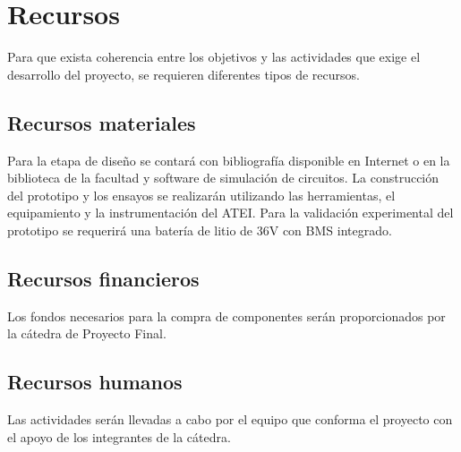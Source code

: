 \section{Recursos}

Para que exista coherencia entre los objetivos y las actividades que exige el desarrollo del proyecto, se requieren diferentes tipos de recursos. 

\subsection{Recursos materiales}
Para la etapa de diseño se contará con bibliografía disponible en Internet o en la biblioteca de la facultad y software de simulación de circuitos.
La construcción del prototipo y los ensayos se realizarán utilizando las herramientas, el equipamiento y la instrumentación del ATEI. 
Para la validación experimental del prototipo se requerirá una batería de litio de 36V con BMS integrado. 

\subsection{Recursos financieros}
Los fondos necesarios para la compra de componentes serán proporcionados por la cátedra de Proyecto Final.

\subsection{Recursos humanos}
Las actividades serán llevadas a cabo por el equipo que conforma el proyecto con el apoyo de los integrantes de la cátedra.